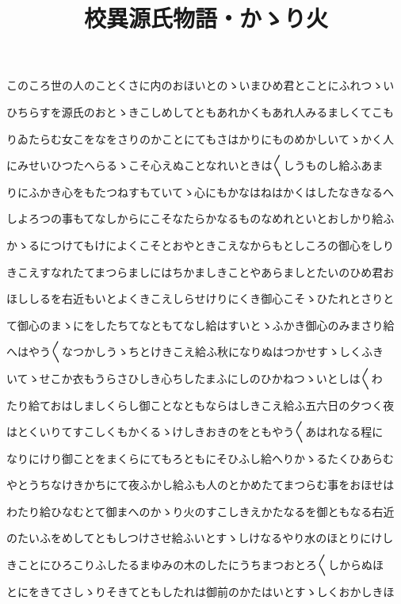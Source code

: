 \documentclass[a4paper,11pt,landscape]{ltjtarticle}
\title{校異源氏物語・かゝり火}
\date{}
\begin{document}
\maketitle

このころ世の人のことくさに内のおほいとのゝいまひめ君とことにふれつゝい
\par\medskip
ひちらすを源氏のおとゝきこしめしてともあれかくもあれ人みるましくてこも
\par\medskip
りゐたらむ女こをなをさりのかことにてもさはかりにものめかしいてゝかく人
\par\medskip
にみせいひつたへらるゝこそ心えぬことなれいときは〱しうものし給ふあま
\par\medskip
りにふかき心をもたつねすもていてゝ心にもかなはねはかくはしたなきなるへ
\par\medskip
しよろつの事もてなしからにこそなたらかなるものなめれといとおしかり給ふ
\par\medskip
かゝるにつけてもけによくこそとおやときこえなからもとしころの御心をしり
\par\medskip
きこえすなれたてまつらましにはちかましきことやあらましとたいのひめ君お
\par\medskip
ほししるを右近もいとよくきこえしらせけりにくき御心こそゝひたれとさりと
\par\medskip
て御心のまゝにをしたちてなともてなし給はすいとゝふかき御心のみまさり給
\par\medskip
へはやう〱なつかしうゝちとけきこえ給ふ秋になりぬはつかせすゝしくふき
\par\medskip
いてゝせこか衣もうらさひしき心ちしたまふにしのひかねつゝいとしは〱わ
\par\medskip
たり給ておはしましくらし御ことなともならはしきこえ給ふ五六日の夕つく夜
\par\medskip
はとくいりてすこしくもかくるゝけしきおきのをともやう〱あはれなる程に
\par\medskip
なりにけり御ことをまくらにてもろともにそひふし給へりかゝるたくひあらむ
\par\medskip
やとうちなけきかちにて夜ふかし給ふも人のとかめたてまつらむ事をおほせは
\par\medskip
わたり給ひなむとて御まへのかゝり火のすこしきえかたなるを御ともなる右近
\par\medskip
のたいふをめしてともしつけさせ給ふいとすゝしけなるやり水のほとりにけし
\par\medskip
きことにひろこりふしたるまゆみの木のしたにうちまつおとろ〱しからぬほ
\par\medskip
とにをきてさしゝりそきてともしたれは御前のかたはいとすゝしくおかしきほ
\end{document}
